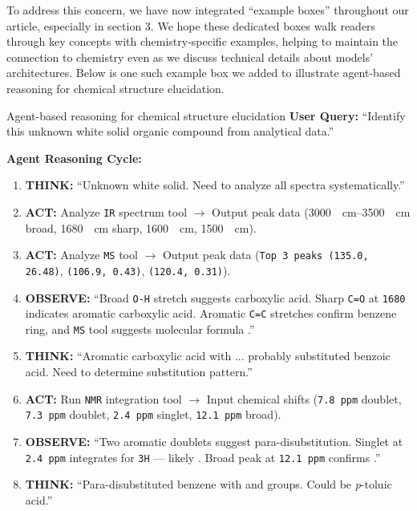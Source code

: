 \begin{reply}
\label{reply:example_boxes}
To address this concern, we have now integrated \enquote{example boxes} throughout our article, especially in section 3. We hope these dedicated boxes walk readers through key concepts with chemistry-specific examples, helping to maintain the connection to chemistry even as we discuss technical details about models' architectures. Below is one such example box we added to illustrate agent-based reasoning for chemical structure elucidation.

\begin{examplebox}[label={example:structure_eluc}]{Agent-based reasoning for chemical structure elucidation} 
\textbf{User Query:} \enquote{Identify this unknown white solid organic compound from analytical data.}

\textbf{Agent Reasoning Cycle:}
\begin{enumerate}
\item \textbf{THINK:} \enquote{Unknown white solid. Need to analyze all spectra systematically.}
\item \textbf{ACT:} Analyze \texttt{IR} spectrum tool $\rightarrow$ Output peak data (\SIrange{3000}{3500}{\per\cm} broad, \SI{1680}{\per\cm} sharp, \SI{1600}{\per\cm}, \SI{1500}{\per\cm}).
\item \textbf{ACT:} Analyze \texttt{MS} tool $\rightarrow$ Output peak data (\texttt{Top 3 peaks (135.0, 26.48)}, \texttt{(106.9, 0.43)}, \texttt{(120.4, 0.31)}).
\item \textbf{OBSERVE:} \enquote{Broad \texttt{O-H} stretch suggests carboxylic acid. Sharp \texttt{C=O} at \texttt{1680} indicates aromatic carboxylic acid. Aromatic \texttt{C=C} stretches confirm benzene ring, and \texttt{MS} tool suggests molecular formula .}
\item \textbf{THINK:} \enquote{Aromatic carboxylic acid with ... probably substituted benzoic acid. Need to determine substitution pattern.}
\item \textbf{ACT:} Run  \texttt{NMR} integration tool $\rightarrow$ Input chemical shifts (\texttt{7.8 ppm} doublet, \texttt{7.3 ppm} doublet, \texttt{2.4 ppm} singlet, \texttt{12.1 ppm} broad).
\item \textbf{OBSERVE:} \enquote{Two aromatic doublets suggest para-disubstitution. Singlet at \texttt{2.4 ppm} integrates for \texttt{3H} --- likely . Broad peak at \texttt{12.1 ppm} confirms .}
\item \textbf{THINK:} \enquote{Para-disubstituted benzene with  and  groups. Could be \textit{p}-toluic acid.}

\end{enumerate}
\end{examplebox}
\end{reply}
